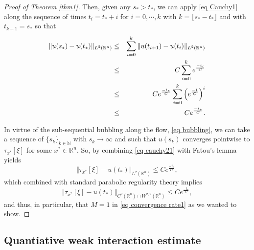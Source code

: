 \documentclass[11pt,letterpaper,reqno]{amsart}
\newcommand{\N}{\mathbb{N}}
\newcommand{\R}{\mathbb{R}}
\theoremstyle{plain}%
\theoremstyle{definition}
\numberwithin{equation}{section}
\numberwithin{figure}{section}
\begin{document}
\begin{proof}[Proof of Theorem \ref{thm1}]
	 Then, given any $s_*>t_*$, we can apply \eqref{eq Cauchy1} along the sequence of times $t_i=t_*+i$ for $i=0,\cdots, k$ with $k=\lfloor s_*-t_*\rfloor$ and with $t_{k+1}=s_*$ so that 
	\begin{eqnarray}\notag
	\Vert u(s_*) -u(t_*)\Vert_{L^{2}(\R^n)} &\leq& \sum_{i=0}^{k} \Vert u(t_{i+1}) -u(t_i)\Vert_{L^{2}(\R^n)}\\\notag
	 &\leq& C\sum_{i=0}^{k}e^\frac{-t_i}{C}\\\notag
	  &\leq& Ce^\frac{-t_*}{C}\sum_{i=0}^{k}\Big( e^\frac{-1}{C}\Big)^i\\\label{eq cauchy21}
	   &\leq& Ce^\frac{-t_*}{C}.
	\end{eqnarray}	
	
	In virtue of the sub-sequential bubbling along the flow, \eqref{eq bubbling}, we can take a sequence of $\{s_k\}_{k\in \N}$ with $s_k \to \infty$ and such that $u(s_k)$ converges pointwise to $\tau_{x^*} [\xi]$ for some $x^* \in \R^n$. So, by combining \eqref{eq cauchy21} with Fatou's lemma yields
    \begin{equation*}
       \Vert \tau_{x^*} [\xi] -u(t_*)\Vert_{L^2(\R^n)} \leq  Ce^\frac{-t_*}{C},
    \end{equation*}
    which combined with standard parabolic regularity theory implies
     \begin{equation}\label{eq rateprof}
       \Vert \tau_{x^*} [\xi] -u(t_*)\Vert_{C^2(\R^n)\cap W^{2,2}(\R^n)} \leq  Ce^\frac{-t_*}{C},
    \end{equation}
    and thus, in particular, that $M=1$ in \eqref{eq convergence rate1} as we wanted to show.	
\end{proof}



\subsection{Quantiative weak interaction estimate}
\end{document}

